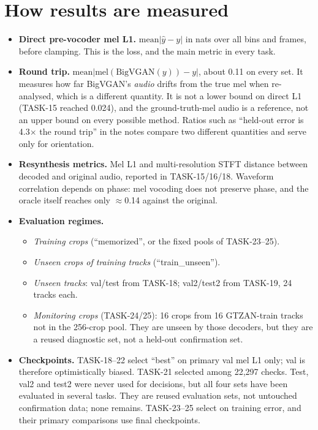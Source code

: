 \documentclass[10pt,letterpaper]{article}
\begin{document}
\section{How results are measured}
\label{sec:metrics}
\begin{itemize}
\item \textbf{Direct pre-vocoder mel L1.} $\mathrm{mean}|\hat y-y|$ in nats over all bins and frames, before clamping. This is the loss, and the main metric in every task.
\item \textbf{Round trip.} $\mathrm{mean}|\mathrm{mel}(\mathrm{BigVGAN}(y))-y|$, about 0.11 on every set. It measures how far BigVGAN's \emph{audio} drifts from the true mel when re-analysed, which is a different quantity. It is not a lower bound on direct L1 (TASK-15 reached 0.024), and the ground-truth-mel audio is a reference, not an upper bound on every possible method. Ratios such as ``held-out error is 4.3$\times$ the round trip'' in the notes compare two different quantities and serve only for orientation.
\item \textbf{Resynthesis metrics.} Mel L1 and multi-resolution STFT distance between decoded and original audio, reported in TASK-15/16/18. Waveform correlation depends on phase: mel vocoding does not preserve phase, and the oracle itself reaches only $\approx$0.14 against the original.
\item \textbf{Evaluation regimes.}
  \begin{itemize}
  \item \emph{Training crops} (``memorized'', or the fixed pools of TASK-23--25).
  \item \emph{Unseen crops of training tracks} (``train\_unseen'').
  \item \emph{Unseen tracks}: val/test from TASK-18; val2/test2 from TASK-19, 24 tracks each.
  \item \emph{Monitoring crops} (TASK-24/25): 16 crops from 16 GTZAN-train tracks not in the 256-crop pool. They are unseen by those decoders, but they are a reused diagnostic set, not a held-out confirmation set.
  \end{itemize}
\item \textbf{Checkpoints.} TASK-18--22 select ``best'' on primary val mel L1 only; val is therefore optimistically biased. TASK-21 selected among 22{,}297 checks. Test, val2 and test2 were never used for decisions, but all four sets have been evaluated in several tasks. They are reused evaluation sets, not untouched confirmation data; none remains. TASK-23--25 select on training error, and their primary comparisons use final checkpoints.

\end{itemize}
\end{document}
